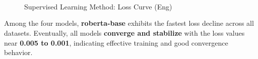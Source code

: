 \documentclass[lettersize,journal]{IEEEtran}
\begin{document}
\begin{figure}[H]
    \centering
    \\
    \\
    \\
        \caption{Supervised Learning Method: Loss Curve (Eng)}
    \end{figure}
 
Among the four models, \textbf{roberta-base} exhibits the fastest loss decline across all datasets. Eventually, all models \textbf{converge and stabilize} with the loss values near \textbf{0.005 to 0.001}, indicating effective training and good convergence behavior.
\end{document}
